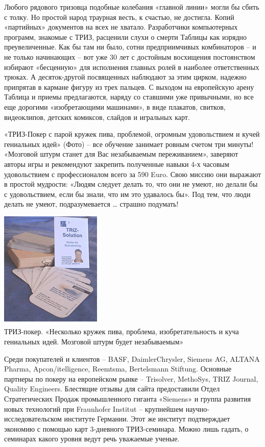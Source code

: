 \documentclass[11pt,a4paper]{article}
\begin{document}
Любого рядового тризовца подобные колебания «главной линии» могли бы сбить с
толку. Но простой народ траурная весть, к счастью, не достигла. Копий
«партийных» документов на всех не хватало. Разработчики компьютерных программ,
знакомые с ТРИЗ, расценили слухи о смерти Таблицы как изрядно преувеличенные.
Как бы там ни было, сотни предприимчивых комбинаторов -- и не только
начинающих -- вот уже 30 лет с достойным восхищения постоянством избирают
«бесценную» для исполнения главных ролей в наиболее ответственных трюках. А
десяток-другой посвященных наблюдают за этим цирком, надежно припрятав в
кармане фигуру из трех пальцев. С выходом на европейскую арену Таблица и
приемы предлагаются, наряду со ставшими уже привычными, но все еще дорогими
«изобретающими машинами», в виде плакатов, свитков, видеоклипов, детских
комиксов, слайдов и игральных карт.

«ТРИЗ-Покер с парой кружек пива, проблемой, огромным удовольствием и кучей
гениальных идей» (Фото) -- все обучение занимает ровным счетом три минуты!
«Мозговой штурм станет для Вас незабываемым переживанием», заверяют авторы
игры и рекомендуют закрепить полученные навыки 4-х часовым удовольствием с
профессионалом всего за 590 Euro. Свою миссию они выражают в простой мудрости:
«Людям следует делать то, что они не умеют, но делали бы с удовольствием, если
бы знали, что им это удавалось бы». Под тем, что люди делать не умеют,
подразумевается … страшно подумать!

\begin{center}
  \includegraphics[width=.5\textwidth]{./7.jpg} \\
  ТРИЗ-покер. «Несколько кружек пива, проблема, изобретательность и куча
  гениальных идей. Мозговой штурм будет незабываемым»
\end{center}
Среди покупателей и клиентов -- BASF, DaimlerChrysler, Siemens AG, ALTANA
Pharma, Apcon/itelligence, Reemtsma, Bertelsmann Stiftung. Основные партнеры
по покеру на европейском рынке -- Trisolver, MethoSys, TRIZ Journal, Quality
Engineers. Блестящие отзывы для сайта предоставили Отдел Стратегических Продаж
промышленного гиганта «Siemens» и группа развития новых технологий при
Fraunhofer Institut -- крупнейшем научно-исследовательском институте Германии.
Этот же институт подтверждает экономию с помощью карт 3-дневного
ТРИЗ-семинара.  Можно лишь гадать, о семинарах какого уровня ведут речь
уважаемые ученые.
\end{document}
